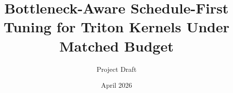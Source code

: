 \documentclass[10pt,twocolumn]{article}
\title{Bottleneck-Aware Schedule-First Tuning for Triton Kernels Under Matched Budget}
\author{Project Draft}
\date{April 2026}
\begin{document}
\maketitle

\begin{abstract}

\end{abstract}










\appendix




\clearpage


\end{document}
